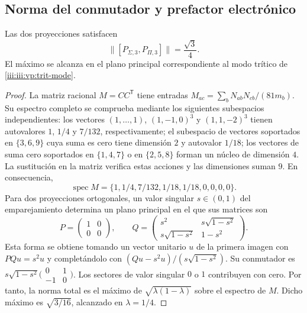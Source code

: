 \subsection{Norma del conmutador y prefactor electrónico}

\begin{theorem}
Las dos proyecciones satisfacen
\begin{equation}
 \bigl\|[P_{\Sigma,3},P_{\Pi,3}]\bigr\|=\frac{\sqrt3}{4}.
 \label{iii:iii:vp:prefactor}
\end{equation}
El máximo se alcanza en el plano principal correspondiente al modo
trítico de \eqref{iii:iii:vp:trit-mode}.
\end{theorem}
\begin{proof}
La matriz racional $M=CC^{\mathsf T}$ tiene entradas
$M_{ac}=\sum_bN_{ab}N_{cb}/(81m_b)$. Su espectro completo se
comprueba mediante los siguientes subespacios independientes: los
vectores $(1,\ldots,1)$, $(1,-1,0)^3$ y $(1,1,-2)^3$ tienen
autovalores $1$, $1/4$ y $7/132$, respectivamente; el subespacio de
vectores soportados en $\{3,6,9\}$ cuya suma es cero tiene dimensión
$2$ y autovalor $1/18$; los vectores de suma cero soportados en
$\{1,4,7\}$ o en $\{2,5,8\}$ forman un núcleo de dimensión $4$.
La sustitución en la matriz verifica estas acciones y las dimensiones
suman $9$. En consecuencia,
\[
 \operatorname{spec}M=
 \{1,1/4,7/132,1/18,1/18,0,0,0,0\}.
\]
Para dos proyecciones ortogonales, un valor singular $s\in(0,1)$ del
emparejamiento determina un plano principal en el que sus matrices son
\[
 P=\begin{pmatrix}1&0\\0&0\end{pmatrix},\qquad
 Q=\begin{pmatrix}s^2&s\sqrt{1-s^2}\\
 s\sqrt{1-s^2}&1-s^2\end{pmatrix}.
\]
Esta forma se obtiene tomando un vector unitario $u$ de la primera
imagen con $PQu=s^2u$ y completándolo con
$(Qu-s^2u)/(s\sqrt{1-s^2})$. Su conmutador es
$s\sqrt{1-s^2}\bigl(\begin{smallmatrix}0&1\\-1&0\end{smallmatrix}\bigr)$.
Los sectores de valor singular $0$ o $1$ contribuyen con cero.
Por tanto, la norma total es el máximo de
$\sqrt{\lambda(1-\lambda)}$ sobre el espectro de $M$. Dicho máximo
es $\sqrt{3/16}$, alcanzado en $\lambda=1/4$.
\end{proof}

